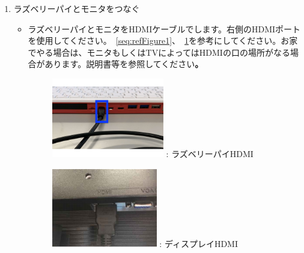\documentclass[a4paper,12pt]{jarticle}
\begin{document}
\begin{enumerate}
\begin{enumerate}
  \item ラズベリーパイとモニタをつなぐ

        \begin{itemize}
          \item
                ラズベリーパイとモニタをHDMIケーブルでします。右側のHDMIポートを使用してください。~\ref{seq:refFigure1}、~\ref{seq:refFigure2}を参考にしてください。お家でやる場合は、モニタもしくはTVによってはHDMIの口の場所がなる場合があります。説明書等を参照してください\textbf{。}


                \begin{figure}[h]
		\centering
                  \begin{minipage}{0.45\textwidth}
                    {\upshape
                      \includegraphics[height=3.471cm]{figure222023.pdf}
                      \newline
                      {\theFigure\label{seq:refFigure1}}:
                      ラズベリーパイHDMI}
                  \end{minipage}
		\centering
                  \begin{minipage}{0.45\textwidth}
                    {\upshape
                      \includegraphics[height=3.471cm]{textbook-img016.png}
                      \newline
                      {\theFigure\label{seq:refFigure2}}:
                      ディスプレイHDMI}
                  \end{minipage}
                \end{figure}


\end{itemize}
\end{enumerate}
\end{enumerate}
\end{document}
